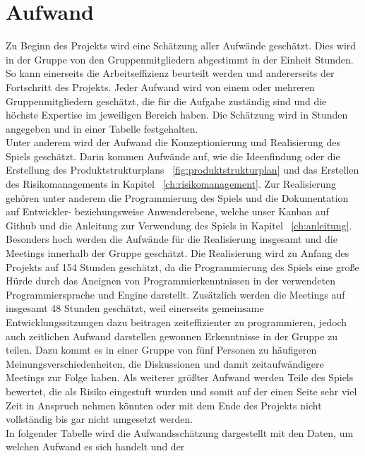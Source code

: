 \chapter{Aufwand}\label{ch:aufwand}
Zu Beginn des Projekts wird eine Schätzung aller Aufwände geschätzt. 
Dies wird in der Gruppe von den Gruppenmitgliedern abgestimmt in der Einheit Stunden.
So kann einerseits die Arbeitseffizienz beurteilt werden und andererseits der Fortschritt des Projekts.
Jeder Aufwand wird von einem oder mehreren Gruppenmitgliedern geschätzt, die für die Aufgabe zuständig sind und 
die höchste Expertise im jeweiligen Bereich haben. 
Die Schätzung wird in Stunden angegeben und in einer Tabelle festgehalten.\\
\newline
Unter anderem wird der Aufwand die Konzeptionierung und Realisierung des Spiels geschätzt.
Darin kommen Aufwände auf, wie die Ideenfindung oder die Erstellung des Produktstrukturplans 
~\ref{fig:produktstrukturplan} und das Erstellen des Risikomanagements in Kapitel ~\ref{ch:risikomanagement}.
Zur Realisierung gehören unter anderem die Programmierung des Spiels und die Dokumentation auf Entwickler-
beziehungsweise Anwenderebene, welche unser Kanban auf Github und die Anleitung zur Verwendung des Spiels in Kapitel
~\ref{ch:anleitung}.\\
\newline
Besonders hoch werden die Aufwände für die Realisierung insgesamt und die Meetings innerhalb der Gruppe geschätzt.
Die Realisierung wird zu Anfang des Projekts auf 154 Stunden geschätzt, da die Programmierung des Spiels eine große Hürde
durch das Aneignen von Programmierkenntnissen in der verwendeten Programmiersprache und Engine darstellt.
Zusätzlich werden die Meetings auf insgesamt 48 Stunden geschätzt, weil einerseits gemeinsame Entwicklungssitzungen dazu
beitragen zeiteffizienter zu programmieren, jedoch auch zeitlichen Aufwand darstellen gewonnen Erkenntnisse in der
Gruppe zu teilen.
Dazu kommt es in einer Gruppe von fünf Personen zu häufigeren Meinungsverschiedenheiten, die Diskussionen und damit
zeitaufwändigere Meetings zur Folge haben.
Als weiterer größter Aufwand werden Teile des Spiels bewertet, die als Risiko eingestuft wurden und somit auf der einen 
Seite sehr viel Zeit in Anspruch nehmen könnten oder mit dem Ende des Projekts nicht vollständig bis gar nicht umgesetzt
werden. \\
\newline
In folgender Tabelle wird die Aufwandsschätzung dargestellt mit den Daten, um welchen Aufwand es sich handelt und der
